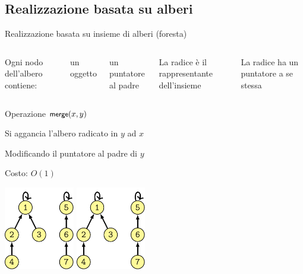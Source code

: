 \subsection{Realizzazione basata su alberi}

\begin{frame}{Realizzazione basata su insieme di alberi (foresta)}

\vspace{-9pt}

\begin{columns}[T]
\BIL
\item Ogni nodo dell'albero contiene:
  \BI
  \item un oggetto
  \item un puntatore al padre
  \EI
\item La radice è il rappresentante dell'insieme
\item La radice ha un puntatore a se stessa
\EIL
{}
\end{columns}

\end{frame}



\begin{frame}{Operazione $\textsf{{\small merge}}(x,y)$}

\vspace{-9pt}
\BIL
\item Si aggancia l'albero radicato in $y$ ad $x$
\item Modificando il puntatore al padre di $y$
\item Costo: $O(1)$
\EIL

\bigskip\centering
\includegraphics[width=0.23\textwidth,page=1,valign=t]{mfset-alberi.pdf}
\qquad{\huge $\Rightarrow$}\quad
\includegraphics[width=0.23\textwidth,page=2,valign=t]{mfset-alberi.pdf}




\end{frame}

